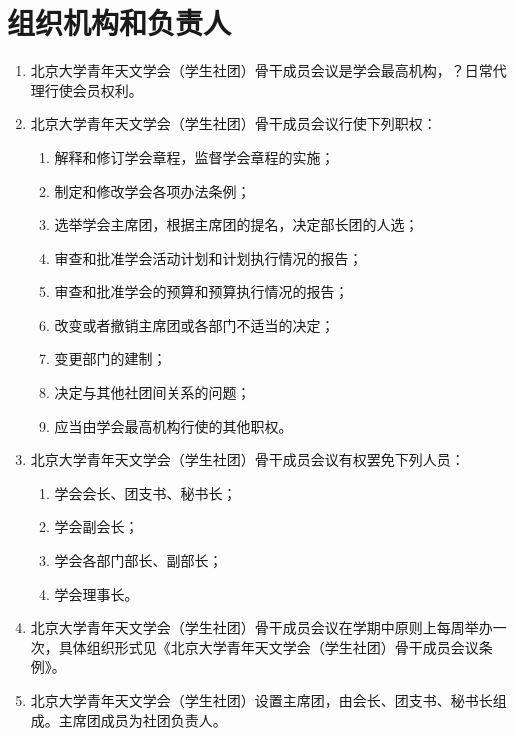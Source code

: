 \section{组织机构和负责人}

\begin{enumerate}[resume]
    \item 北京大学青年天文学会（学生社团）骨干成员会议是学会最高机构，？日常代理行使会员权利。
    
    \item 北京大学青年天文学会（学生社团）骨干成员会议行使下列职权：
    
    \begin{enumerate}
        \item 解释和修订学会章程，监督学会章程的实施；
        \item 制定和修改学会各项办法条例；
        \item 选举学会主席团，根据主席团的提名，决定部长团的人选；
        \item 审查和批准学会活动计划和计划执行情况的报告；
        \item 审查和批准学会的预算和预算执行情况的报告；
        \item 改变或者撤销主席团或各部门不适当的决定；
        \item 变更部门的建制；
        \item 决定与其他社团间关系的问题；
        \item 应当由学会最高机构行使的其他职权。
    \end{enumerate}
    
    \item 北京大学青年天文学会（学生社团）骨干成员会议有权罢免下列人员：
    
    \begin{enumerate}
        \item 学会会长、团支书、秘书长；
        \item 学会副会长；
        \item 学会各部门部长、副部长；
        \item 学会理事长。
    \end{enumerate}
    
    \item 北京大学青年天文学会（学生社团）骨干成员会议在学期中原则上每周举办一次，具体组织形式见《北京大学青年天文学会（学生社团）骨干成员会议条例》。
    
    \item 北京大学青年天文学会（学生社团）设置主席团，由会长、团支书、秘书长组成。主席团成员为社团负责人。
    

\end{enumerate}
